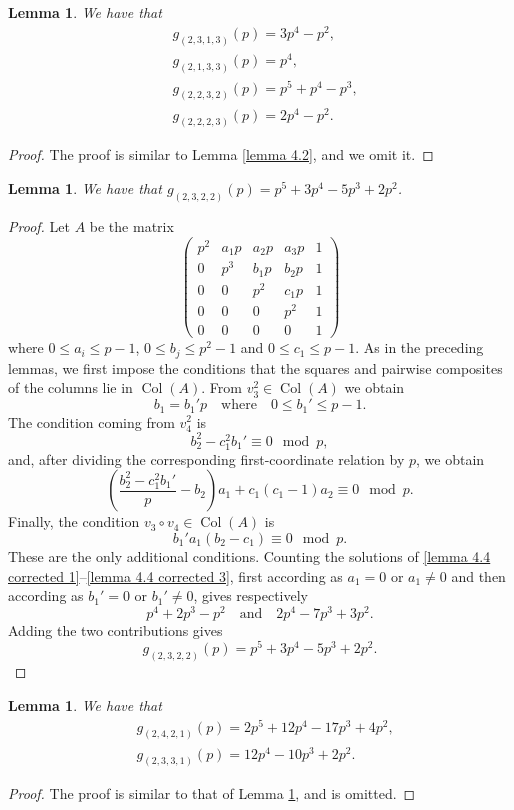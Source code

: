 \documentclass[a4paper]{amsart}
\newtheorem{lemma}[theorem]{Lemma}
\numberwithin{equation}{section}
\theoremstyle{remark}
\newcommand{\op}[1]{\operatorname{#1}}
\begin{document}
\begin{lemma}
We have that \[\begin{split}& g_{(2,3,1,3)}(p) = 3p^4-p^2, \\
& g_{(2,1,3,3)}(p) = p^4,\\
& g_{(2,2,3,2)}(p)=p^5+p^4-p^3, \\
& g_{(2,2,2,3)}(p)=2p^4-p^2.\end{split}\]
\end{lemma}
\begin{proof}
The proof is similar to Lemma \ref{lemma 4.2}, and we omit it.
\end{proof}
\begin{lemma}\label{lemma 4.4}
We have that $g_{(2,3,2,2)}(p)=p^5+3p^4-5p^3+2p^2$.
\end{lemma}
\begin{proof}
Let $A$ be the matrix
$$\begin{pmatrix}p^2 & a_1p & a_2p & a_3p & 1\\ 0 & p^3 & b_1p & b_2p & 1\\
0 & 0 & p^2 & c_1p & 1\\
0 & 0 & 0 & p^2 & 1\\
0 & 0 & 0 & 0 & 1\end{pmatrix}$$
where $0\leq a_i\leq p-1$, $0\leq b_j\leq p^2-1$ and $0\leq c_1\leq p-1$. As in the preceding lemmas, we first impose the conditions that the squares and pairwise composites of the columns lie in $\op{Col}(A)$. From $v_3^2\in\op{Col}(A)$ we obtain
\[b_1=b_1'p\quad\text{where}\quad 0\leq b_1'\leq p-1.\]
The condition coming from $v_4^2$ is
\begin{equation}\label{lemma 4.4 corrected 1}
b_2^2-c_1^2b_1'\equiv 0\mod p,
\end{equation}
and, after dividing the corresponding first-coordinate relation by $p$, we obtain
\begin{equation}\label{lemma 4.4 corrected 2}
\left(\frac{b_2^2-c_1^2b_1'}p-b_2\right)a_1+c_1(c_1-1)a_2\equiv0\mod p.
\end{equation}
Finally, the condition $v_3\circ v_4\in\op{Col}(A)$ is
\begin{equation}\label{lemma 4.4 corrected 3}
b_1'a_1(b_2-c_1)\equiv0\mod p.
\end{equation}
These are the only additional conditions. Counting the solutions of \eqref{lemma 4.4 corrected 1}--\eqref{lemma 4.4 corrected 3}, first according as $a_1=0$ or $a_1\neq0$ and then according as $b_1'=0$ or $b_1'\neq0$, gives respectively
\[p^4+2p^3-p^2\quad\text{and}\quad 2p^4-7p^3+3p^2.\]
Adding the two contributions gives
\[g_{(2,3,2,2)}(p)=p^5+3p^4-5p^3+2p^2.\]
\end{proof}
\begin{lemma} We have that \[\begin{split} & g_{(2,4,2,1)}(p) = 2p^5+12p^4-17p^3+4p^2, \\ 
& g_{(2,3,3,1)}(p) = 12p^4-10p^3+2p^2.\end{split}\]
\end{lemma}
\begin{proof}
The proof is similar to that of Lemma \ref{lemma 4.4}, and is omitted.
\end{proof}
\end{document}
